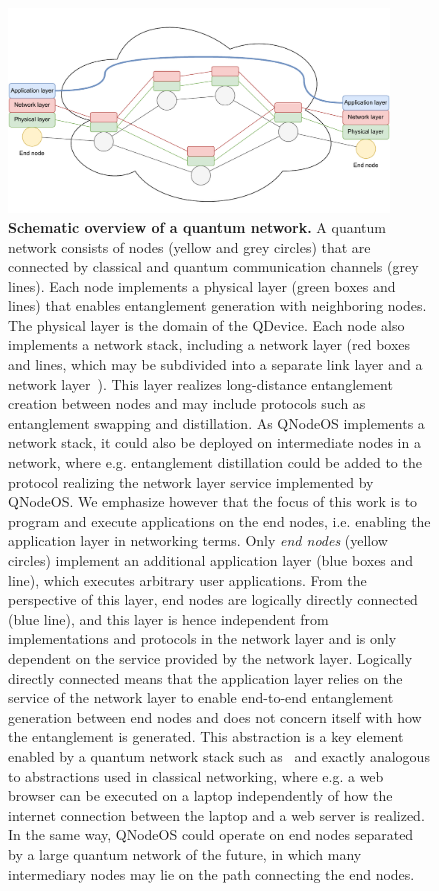 \begin{figure}[tp]
    \centering
    \includegraphics[width=0.9\textwidth]{figures/qnodeos/supplementary/network_nodes.pdf}
    \caption{
        \textbf{Schematic overview of a quantum network.}
        A quantum network consists of nodes (yellow and grey circles) that are connected by classical and quantum communication channels (grey lines). Each node implements a physical layer (green boxes and lines) that enables entanglement generation with neighboring nodes. The physical layer is the domain of the QDevice. Each node also implements a network stack, including a network layer (red boxes and lines, which may be subdivided into a separate link layer and a network layer~\cite{dahlberg_2019_egp, kozlowski_2019_towards}). This layer realizes long-distance entanglement creation between nodes and may include protocols such as entanglement swapping and distillation. As QNodeOS implements a network stack, it could also be deployed on intermediate nodes in a network, where e.g. entanglement distillation could be added to the protocol realizing the network layer service implemented by QNodeOS.  \newline
        We emphasize however that the focus of this work is to program and execute applications on the end nodes, i.e. enabling the application layer in networking terms. Only \emph{end nodes} (yellow circles) implement an additional application layer (blue boxes and line), which executes arbitrary user applications. From the perspective of this layer, end nodes are logically directly connected (blue line), and this layer is hence independent from implementations and protocols in the network layer and is only dependent on the service  provided by the network layer. Logically directly connected means that the application layer relies on the service of the network layer to enable end-to-end entanglement generation between end nodes and does not concern itself with how the entanglement is generated. This abstraction is a key element enabled by a quantum network stack such as~\cite{dahlberg_2019_egp} and exactly analogous to abstractions used in classical networking, where e.g. a web browser can be executed on a laptop independently of how the internet connection between the laptop and a web server is realized. In the same way, QNodeOS could operate on end nodes separated by a large quantum network of the future, in which many intermediary nodes may lie on the path connecting the end nodes.}
        

\end{figure}
